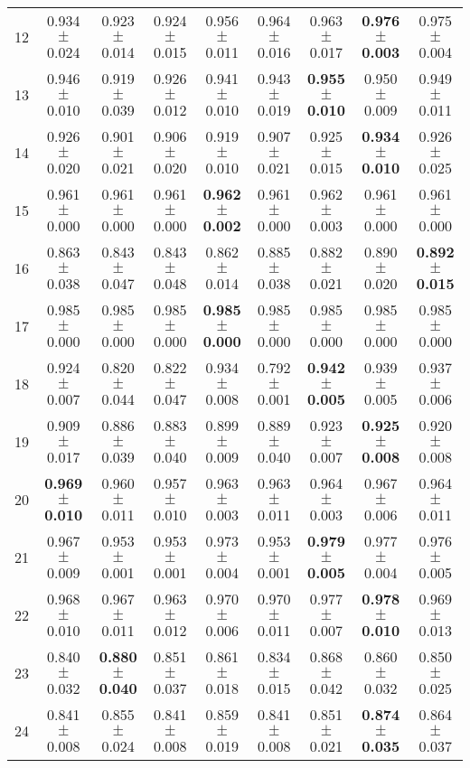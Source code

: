 \begin{table}[!ht]
{\begin{tabular}{r c c c c c c c c}
12 & 0.934 $\pm$ 0.024 & 0.923 $\pm$ 0.014 & 0.924 $\pm$ 0.015 & 0.956 $\pm$ 0.011 & 0.964 $\pm$ 0.016 & 0.963 $\pm$ 0.017 & \textbf{0.976 $\pm$ 0.003} & 0.975 $\pm$ 0.004 \\
13 & 0.946 $\pm$ 0.010 & 0.919 $\pm$ 0.039 & 0.926 $\pm$ 0.012 & 0.941 $\pm$ 0.010 & 0.943 $\pm$ 0.019 & \textbf{0.955 $\pm$ 0.010} & 0.950 $\pm$ 0.009 & 0.949 $\pm$ 0.011 \\
14 & 0.926 $\pm$ 0.020 & 0.901 $\pm$ 0.021 & 0.906 $\pm$ 0.020 & 0.919 $\pm$ 0.010 & 0.907 $\pm$ 0.021 & 0.925 $\pm$ 0.015 & \textbf{0.934 $\pm$ 0.010} & 0.926 $\pm$ 0.025 \\
15 & 0.961 $\pm$ 0.000 & 0.961 $\pm$ 0.000 & 0.961 $\pm$ 0.000 & \textbf{0.962 $\pm$ 0.002} & 0.961 $\pm$ 0.000 & 0.962 $\pm$ 0.003 & 0.961 $\pm$ 0.000 & 0.961 $\pm$ 0.000 \\
16 & 0.863 $\pm$ 0.038 & 0.843 $\pm$ 0.047 & 0.843 $\pm$ 0.048 & 0.862 $\pm$ 0.014 & 0.885 $\pm$ 0.038 & 0.882 $\pm$ 0.021 & 0.890 $\pm$ 0.020 & \textbf{0.892 $\pm$ 0.015} \\
17 & 0.985 $\pm$ 0.000 & 0.985 $\pm$ 0.000 & 0.985 $\pm$ 0.000 & \textbf{0.985 $\pm$ 0.000} & 0.985 $\pm$ 0.000 & 0.985 $\pm$ 0.000 & 0.985 $\pm$ 0.000 & 0.985 $\pm$ 0.000 \\
18 & 0.924 $\pm$ 0.007 & 0.820 $\pm$ 0.044 & 0.822 $\pm$ 0.047 & 0.934 $\pm$ 0.008 & 0.792 $\pm$ 0.001 & \textbf{0.942 $\pm$ 0.005} & 0.939 $\pm$ 0.005 & 0.937 $\pm$ 0.006 \\
19 & 0.909 $\pm$ 0.017 & 0.886 $\pm$ 0.039 & 0.883 $\pm$ 0.040 & 0.899 $\pm$ 0.009 & 0.889 $\pm$ 0.040 & 0.923 $\pm$ 0.007 & \textbf{0.925 $\pm$ 0.008} & 0.920 $\pm$ 0.008 \\
20 & \textbf{0.969 $\pm$ 0.010} & 0.960 $\pm$ 0.011 & 0.957 $\pm$ 0.010 & 0.963 $\pm$ 0.003 & 0.963 $\pm$ 0.011 & 0.964 $\pm$ 0.003 & 0.967 $\pm$ 0.006 & 0.964 $\pm$ 0.011 \\
21 & 0.967 $\pm$ 0.009 & 0.953 $\pm$ 0.001 & 0.953 $\pm$ 0.001 & 0.973 $\pm$ 0.004 & 0.953 $\pm$ 0.001 & \textbf{0.979 $\pm$ 0.005} & 0.977 $\pm$ 0.004 & 0.976 $\pm$ 0.005 \\
22 & 0.968 $\pm$ 0.010 & 0.967 $\pm$ 0.011 & 0.963 $\pm$ 0.012 & 0.970 $\pm$ 0.006 & 0.970 $\pm$ 0.011 & 0.977 $\pm$ 0.007 & \textbf{0.978 $\pm$ 0.010} & 0.969 $\pm$ 0.013 \\
23 & 0.840 $\pm$ 0.032 & \textbf{0.880 $\pm$ 0.040} & 0.851 $\pm$ 0.037 & 0.861 $\pm$ 0.018 & 0.834 $\pm$ 0.015 & 0.868 $\pm$ 0.042 & 0.860 $\pm$ 0.032 & 0.850 $\pm$ 0.025 \\
24 & 0.841 $\pm$ 0.008 & 0.855 $\pm$ 0.024 & 0.841 $\pm$ 0.008 & 0.859 $\pm$ 0.019 & 0.841 $\pm$ 0.008 & 0.851 $\pm$ 0.021 & \textbf{0.874 $\pm$ 0.035} & 0.864 $\pm$ 0.037 \\

\end{tabular}}
\end{table}
